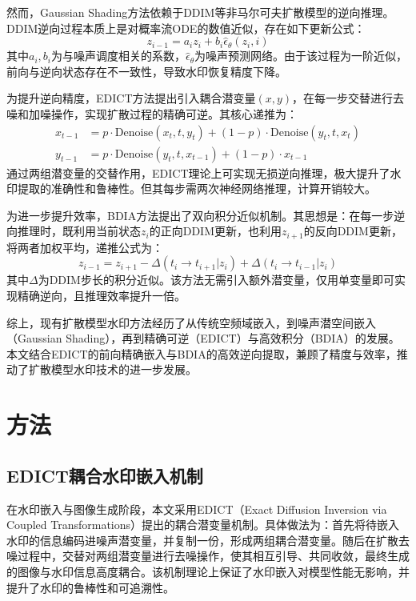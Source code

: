 \documentclass[conference]{IEEEtran}
\begin{document}
然而，Gaussian Shading方法依赖于DDIM等非马尔可夫扩散模型的逆向推理。DDIM逆向过程本质上是对概率流ODE的数值近似，存在如下更新公式：
\begin{equation}
    z_{i-1} = a_i z_i + b_i \hat{\epsilon}_\theta(z_i, i)
\end{equation}
其中$a_i, b_i$为与噪声调度相关的系数，$\hat{\epsilon}_\theta$为噪声预测网络。由于该过程为一阶近似，前向与逆向状态存在不一致性，导致水印恢复精度下降。

为提升逆向精度，EDICT方法\cite{panthi2025watermarkingdiffusionmodelgaussian}提出引入耦合潜变量$(x, y)$，在每一步交替进行去噪和加噪操作，实现扩散过程的精确可逆。其核心递推为：
\begin{align}
    x_{t-1} &= p \cdot \text{Denoise}(x_t, t, y_t) + (1-p) \cdot \text{Denoise}(y_t, t, x_t) \\
    y_{t-1} &= p \cdot \text{Denoise}(y_t, t, x_{t-1}) + (1-p) \cdot x_{t-1}
\end{align}
通过两组潜变量的交替作用，EDICT理论上可实现无损逆向推理，极大提升了水印提取的准确性和鲁棒性。但其每步需两次神经网络推理，计算开销较大。

为进一步提升效率，BDIA方法\cite{zhang2024exact}提出了双向积分近似机制。其思想是：在每一步逆向推理时，既利用当前状态$z_i$的正向DDIM更新，也利用$z_{i+1}$的反向DDIM更新，将两者加权平均，递推公式为：
\begin{equation}
    z_{i-1} = z_{i+1} - \Delta(t_i \to t_{i+1}|z_i) + \Delta(t_i \to t_{i-1}|z_i)
\end{equation}
其中$\Delta$为DDIM步长的积分近似。该方法无需引入额外潜变量，仅用单变量即可实现精确逆向，且推理效率提升一倍。

综上，现有扩散模型水印方法经历了从传统空频域嵌入，到噪声潜空间嵌入（Gaussian Shading），再到精确可逆（EDICT）与高效积分（BDIA）的发展。本文结合EDICT的前向精确嵌入与BDIA的高效逆向提取，兼顾了精度与效率，推动了扩散模型水印技术的进一步发展。

\section{方法}
\subsection{EDICT耦合水印嵌入机制}
在水印嵌入与图像生成阶段，本文采用EDICT（Exact Diffusion Inversion via Coupled Transformations）提出的耦合潜变量机制。具体做法为：首先将待嵌入水印的信息编码进噪声潜变量，并复制一份，形成两组耦合潜变量。随后在扩散去噪过程中，交替对两组潜变量进行去噪操作，使其相互引导、共同收敛，最终生成的图像与水印信息高度耦合。该机制理论上保证了水印嵌入对模型性能无影响，并提升了水印的鲁棒性和可追溯性。
\end{document}
